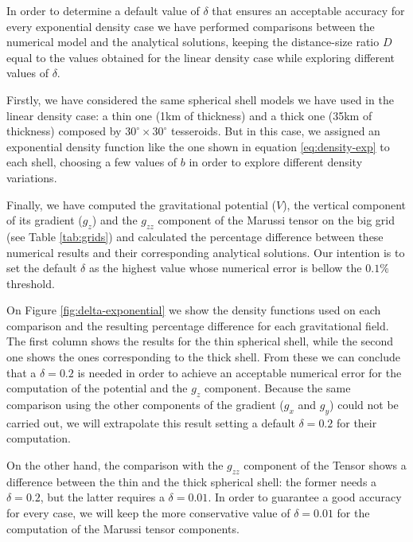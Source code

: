 \documentclass[extra]{gji}
\begin{document}
In order to determine a default value of $\delta$ that ensures an
acceptable accuracy for every exponential density case we have
performed comparisons between the numerical model and the analytical
solutions, keeping the distance-size ratio $D$ equal to the values
obtained for the linear density case while exploring different values of
$\delta$.

Firstly, we have considered the same spherical shell models we have
used in the linear density case: a thin one (1km of thickness) and a
thick one (35km of thickness) composed by $30^\circ \times 30^\circ$
tesseroids.
But in this case, we assigned an exponential density function like the
one shown in equation \ref{eq:density-exp} to each shell, choosing
a few values of $b$ in order to explore different density
variations.

Finally, we have computed the gravitational potential ($V$), the
vertical component of its gradient ($g_z$) and the $g_{zz}$ component of
the Marussi tensor on the big grid (see Table \ref{tab:grids}) and
calculated the percentage difference between these numerical results and
their corresponding analytical solutions.
Our intention is to set the default $\delta$ as the highest value whose
numerical error is bellow the $0.1\%$ threshold.

On Figure \ref{fig:delta-exponential} we show the density functions
used on each comparison and the resulting percentage difference for each
gravitational field.
The first column shows the results for the thin spherical shell, while the
second one shows the ones corresponding to the thick shell.
From these we can conclude that a $\delta = 0.2$ is needed in order to
achieve an acceptable numerical error for the computation of the
potential and the $g_z$ component.
Because the same comparison using the other components of the gradient ($g_x$
and $g_y$) could not be carried out, we will extrapolate this result
setting a default $\delta = 0.2$ for their computation.

On the other hand, the comparison with the $g_{zz}$ component of the
Tensor shows a difference between the thin and the thick spherical
shell: the former needs a $\delta = 0.2$, but the latter requires a
$\delta = 0.01$.
In order to guarantee a good accuracy for every case, we will keep the
more conservative value of $\delta = 0.01$ for the computation of the
Marussi tensor components.
\end{document}
